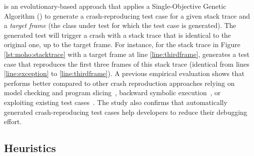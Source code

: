 \evocrash is an evolutionary-based approach that applies a Single-Objective Genetic Algorithm (\SGGA) to generate a crash-reproducing test case for a given stack trace and a \emph{target frame} (\ie the class under test for which the test case is generated).  The generated test will trigger a crash with a stack trace that is identical to the original one, up to the target frame.
For instance, for the stack trace in Figure \ref{lst:moho:stacktrace} with a target frame at line \ref{line:thirdframe}, \evocrash generates a test case that reproduces the first three frames of this stack trace (\ie identical from lines \ref{line:exception} to \ref{line:thirdframe}).
A previous empirical evaluation \cite{Soltani2018a} shows that \evocrash performs better compared to other crash reproduction approaches relying on model checking and program slicing~\cite{nayrolles2015jcharming, Nayrolles2017}, backward symbolic execution~\cite{Chen2015}, or exploiting existing test cases~\cite{Xuan2015}.
The study also confirms that automatically generated crash-reproducing test cases help developers to reduce their debugging effort.

\subsection{\SGGA Heuristics}

